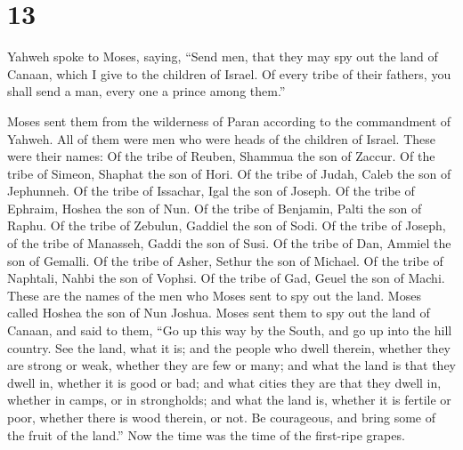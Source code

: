 \hypertarget{section-12}{%
\section{13}\label{section-12}}

 Yahweh spoke to Moses, saying,  ``Send men,
that they may spy out the land of Canaan, which I give to the children
of Israel. Of every tribe of their fathers, you shall send a man, every
one a prince among them.''

 Moses sent them from the wilderness of Paran according to
the commandment of Yahweh. All of them were men who were heads of the
children of Israel.  These were their names: Of the tribe
of Reuben, Shammua the son of Zaccur.  Of the tribe of
Simeon, Shaphat the son of Hori.  Of the tribe of Judah,
Caleb the son of Jephunneh.  Of the tribe of Issachar,
Igal the son of Joseph.  Of the tribe of Ephraim, Hoshea
the son of Nun.  Of the tribe of Benjamin, Palti the son
of Raphu.  Of the tribe of Zebulun, Gaddiel the son of
Sodi.  Of the tribe of Joseph, of the tribe of Manasseh,
Gaddi the son of Susi.  Of the tribe of Dan, Ammiel the
son of Gemalli.  Of the tribe of Asher, Sethur the son of
Michael.  Of the tribe of Naphtali, Nahbi the son of
Vophsi.  Of the tribe of Gad, Geuel the son of Machi.
 These are the names of the men who Moses sent to spy out
the land. Moses called Hoshea the son of Nun Joshua. 
Moses sent them to spy out the land of Canaan, and said to them, ``Go up
this way by the South, and go up into the hill country. 
See the land, what it is; and the people who dwell therein, whether they
are strong or weak, whether they are few or many;  and
what the land is that they dwell in, whether it is good or bad; and what
cities they are that they dwell in, whether in camps, or in strongholds;
 and what the land is, whether it is fertile or poor,
whether there is wood therein, or not. Be courageous, and bring some of
the fruit of the land.'' Now the time was the time of the first-ripe
grapes.

